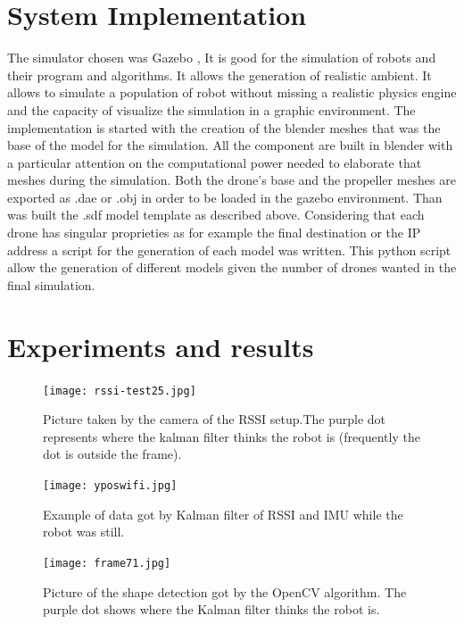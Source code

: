 \documentclass[11pt,twocolumn]{article}
\begin{document}
\section{System Implementation}
The simulator chosen was Gazebo \cite{gazebo}, It is good for the simulation of robots and their program and algorithms. It allows the generation of realistic ambient. It allows to simulate a population of robot without missing a realistic physics engine and the capacity of visualize the simulation in a graphic environment.
The implementation is started with the creation of the blender meshes that was the base of the model for the simulation. All the component are built in blender with a particular attention on the computational power needed to elaborate that meshes during the simulation. Both the drone's base and the propeller meshes are exported as .dae or .obj in order to be loaded in the gazebo environment. Than was built the .sdf model template as described above. Considering that each drone has singular proprieties as for example the final destination or the IP address a script for the generation of each model was written. This python script allow the generation of different models given the number of drones wanted in the final simulation.    

\section{Experiments and results}

\newline

\begin{figure}[ht!]
\centering
\texttt{[image: rssi-test25.jpg]}
\caption{Picture taken by the camera of the RSSI setup.The purple dot represents where the kalman filter thinks the robot is (frequently the dot is outside the frame).}
\label{rssi-test25.jpg}
\end{figure}

\begin{figure}[ht!]
\centering
\texttt{[image: yposwifi.jpg]}
\caption{Example of data got by Kalman filter of RSSI and IMU while the robot was still.}
\label{yposwifi.jpg}
\end{figure}

\begin{figure}[ht!]
\centering
\texttt{[image: frame71.jpg]}
\caption{Picture of the shape detection got by the OpenCV algorithm. The purple dot shows where the Kalman filter thinks the robot is.}
\label{frame71.jpg}
\end{figure}
\end{document}
